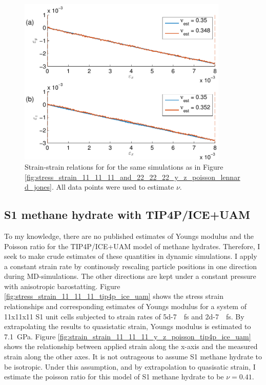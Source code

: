 \begin{figure}
\centering
\includegraphics[width=10cm]{../figures/thesis/strain_strain_11_11_11_and_22_22_22_y_z_poisson_lennard_jones.pdf}
\caption{Strain-strain relations for for the same simulations as in Figure \ref{fig:stress_strain_11_11_11_and_22_22_22_y_z_poisson_lennard_jones}. All data points were used to estimate $\nu$.}
\label{fig:strain_strain_11_11_11_and_22_22_22_y_z_poisson_lennard_jones}
\end{figure}

\subsection{S1 methane hydrate with TIP4P/ICE+UAM}
To my knowledge, there are no published estimates of Youngs modulus and the Poisson ratio for the TIP4P/ICE+UAM model of methane hydrates. Therefore, I seek to make crude estimates of these quantities in dynamic simulations. I apply a constant strain rate by continously rescaling particle positions in one direction during MD-simulations. The other directions are kept under a constant pressure with anisotropic barostatting.
Figure \ref{fig:stress_strain_11_11_11_tip4p_ice_uam} shows the stress strain relationships and corresponding estimates of Youngs modulus for a system of 11x11x11 S1 unit cells subjected to strain rates of \SI{5d-7}{\per\femto\second} and \SI{2d-7}{\per\femto\second}. By extrapolating the results to quasistatic strain, Youngs modulus is estimated to \SI{7.1}{\giga\pascal}. 
Figure \ref{fig:strain_strain_11_11_11_y_z_poisson_tip4p_ice_uam} shows the relationship between applied strain along the x-axis and the measured strain along the other axes. It is not outrageous to assume S1 methane hydrate to be isotropic. Under this assumption, and by extrapolation to quasisatic strain, I estimate the poisson ratio for this model of S1 methane hydrate to be $\nu = 0.41$. 

